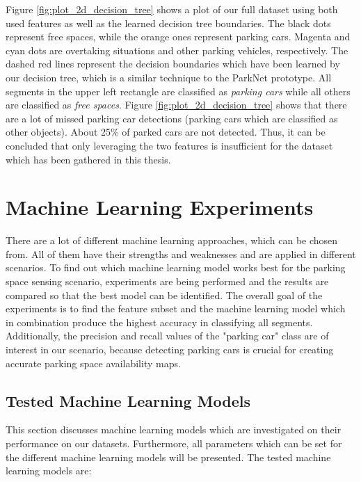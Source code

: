 Figure \ref{fig:plot_2d_decision_tree} shows a plot of our full dataset using both used features as well as the learned decision tree boundaries. The black dots represent free spaces, while the orange ones represent parking cars. Magenta and cyan dots are overtaking situations and other parking vehicles, respectively. The dashed red lines represent the decision boundaries which have been learned by our decision tree, which is a similar technique to the ParkNet prototype. All segments in the upper left rectangle are classified as \emph{parking cars} while all others are classified as \emph{free spaces}. Figure \ref{fig:plot_2d_decision_tree} shows that there are a lot of missed parking car detections (parking cars which are classified as other objects). About 25\% of parked cars are not detected. Thus, it can be concluded that only leveraging the two features is insufficient for the dataset which has been gathered in this thesis.










\section{Machine Learning Experiments}
\label{sec:machine_learning_experiments}

There are a lot of different machine learning approaches, which can be chosen from. All of them have their strengths and weaknesses and are applied in different scenarios. To find out which machine learning model works best for the parking space sensing scenario, experiments are being performed and the results are compared so that the best model can be identified. 
The overall goal of the experiments is to find the feature subset and the machine learning model which in combination produce the highest accuracy in classifying all segments. 
Additionally, the precision and recall values of the "parking car" class are of interest in our scenario, because detecting parking cars is crucial for creating accurate parking space availability maps.





\subsection{Tested Machine Learning Models}
\label{sec:machine_learning_models}

This section discusses machine learning models which are investigated on their performance on our datasets. Furthermore, all parameters which can be set for the different machine learning models will be presented. The tested machine learning models are:


